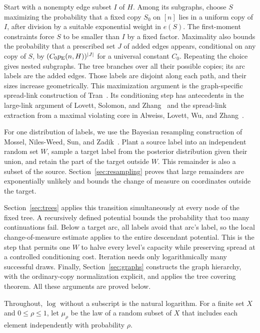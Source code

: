 Start with a nonempty edge subset $I$ of $H$. Among its subgraphs,
choose $S$ maximizing the probability that a fixed copy $S_0$ on
$[n]$ lies in a uniform copy of $I$, after division by a suitable
exponential weight in $e(S)$.
The first-moment constraints force $S$ to be smaller than $I$ by
a fixed factor. Maximality also bounds the probability that a prescribed
set $J$ of added edges appears, conditional on any copy of $S$, by
$(C_0p_{\mathrm E}(n,H))^{|J|}$ for a universal constant $C_0$.
Repeating the choice gives nested subgraphs.
The tree branches over all their possible copies; its arc labels
are the added edges. Those labels are disjoint along each path,
and their sizes increase geometrically. This maximization argument
is the graph-specific spread-link construction of Tran~\cite[Section~3]{Tran26}.
Its conditioning step has antecedents in the large-link argument of
Lovett, Solomon, and Zhang~\cite[Claim~29]{LSZ19} and the spread-link
extraction from a maximal violating core in
Alweiss, Lovett, Wu, and Zhang~\cite[Lemma~2.4]{ALWZ21}.

For one distribution of labels, we use the Bayesian resampling
construction of Mossel, Niles-Weed, Sun, and Zadik~\cite{MNSZ25}.
Plant a source label into an independent random set $W$, sample a
target label from the posterior distribution given their union, and
retain the part of the target outside $W$. This remainder is also a
subset of the source. Section~\ref{sec:resampling} proves that large
remainders are exponentially unlikely and bounds the change of
measure on coordinates outside the target.

Section~\ref{sec:trees} applies this transition simultaneously at
every node of the fixed tree. A recursively defined potential bounds
the probability that too many continuations fail. Below a target
arc, all labels avoid that arc's label, so the local change-of-measure
estimate applies to the entire descendant potential. This is the
step that permits one $W$ to halve every level's capacity while
preserving spread at a controlled conditioning cost. Iteration needs
only logarithmically many successful draws. Finally,
Section~\ref{sec:graphs} constructs the graph hierarchy, with the
ordinary-copy normalization explicit, and applies the tree covering
theorem. All these arguments are proved below.

Throughout, $\log$ without a subscript is the natural logarithm.
For a finite set $X$ and $0\le\rho\le1$, let $\mu_\rho$ be the law
of a random subset of $X$ that includes each element independently
with probability $\rho$.
